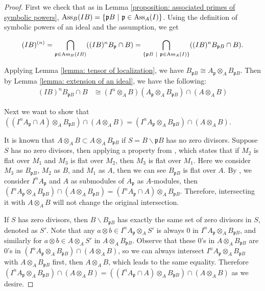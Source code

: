 \documentclass[12pt]{amsart}
\numberwithin{equation}{section}
\theoremstyle{definition}
\DeclareMathOperator{\Ass}{Ass}
\def\pp{{\frak p}}
\begin{document}
	\begin{proof} 
	First we check that as in Lemma \ref{proposition: associated primes of symbolic powers},  $\Ass_B (IB) = \{ {\pp}B ~|~ {\pp} \in \Ass_A (I) \} $. 	
Using the definition of symbolic powers of an ideal and the assumption, we get
		
$$(IB)^{(n)} = \bigcap_{{\pp} \in \Ass_B(IB)} ((IB)^n B_{{\pp}} \cap B)=\bigcap_{\{ {\pp}B ~|~ {\pp} \in \Ass_A(I) \}} ((IB)^n B_{ {\pp}B } \cap B).$$

Applying Lemma \ref{lemma: tensor of localization}, we have $B_{\mathfrak{p}B} \cong A_{\mathfrak{p}} \otimes_A B_{\mathfrak{p}B}$. Then by Lemma \ref{lemma: extension of an ideal}, we have the following:
			\begin{align*}
			(IB)^n B_{\mathfrak{p}B} \cap B &\cong (I^n \otimes_A B) (A_{\mathfrak{p}} \otimes_A B_{\mathfrak{p}B}) \cap (A \otimes_A B)
		\end{align*}
\par Next we want to show that $(( I^n A_{\mathfrak{p}} \cap A ) \otimes_A B_{\mathfrak{p}B}) \cap (A \otimes_A B) = ( I^n A_{\mathfrak{p}} \otimes_A B_{\mathfrak{p}B} ) \cap (A \otimes_A B)$. 

It is known that $A \otimes_A B \subset A \otimes_A B_{\mathfrak{p}B} $ if $S = B \backslash \mathfrak{p}B$ has no zero divisors. Suppose $S$ has no zero divisors, then applying a property from \cite[section 7]{matsumura1989commutative}, which states that if $M_2$ is flat over $M_1$ and $M_3$ is flat over $M_2$, then $M_3$ is flat over $M_1$. Here we consider $M_3$ as $B_{\mathfrak{p}B}$, $M_2$ as $B$, and $M_1$ as $A$, then we can see $B_{\mathfrak{p}B}$ is flat over $A$. By \cite[Theorem 7.4(I)]{matsumura1989commutative}, we consider $I^n A_{\mathfrak{p}}$ and $A$ as submodules of $A_{\mathfrak{p}}$ as $A$-modules, then $\left(I^n A_{\mathfrak{p}} \otimes_A B_{\mathfrak{p}B}\right) \cap \left( A \otimes_A B_{\mathfrak{p}B}\right) = ( I^n A_{\mathfrak{p}} \cap A ) \otimes_A B_{\mathfrak{p}B}$.  Therefore, intersecting it with $A\otimes_A B$ will not change the original intersection. 

If $S$ has zero divisors, then $B \backslash B_{\mathfrak{p}B}$ has exactly the same set of zero divisors in $S$, denoted as $S'$. Note that any $a \otimes b \in I^n A_{\mathfrak{p}} \otimes_A S'$ is always $0$ in $I^n A_{\mathfrak{p}} \otimes_A B_{\mathfrak{p}B}$, and similarly for $a \otimes b \in A \otimes_A S'$ in $A \otimes_A B_{\mathfrak{p}B}$. Observe that these 0's in $A \otimes_A B_{\mathfrak{p}B}$ are 0's in $( I^n A_{\mathfrak{p}} \otimes_A B_{\mathfrak{p}B} ) \cap (A \otimes_A B)$, so we can always intersect $I^n A_{\mathfrak{p}} \otimes_A B_{\mathfrak{p}B}$ with $A \otimes_A B_{\mathfrak{p}B}$ first, then $A \otimes_A B$, which leads to the same equality. Therefore $( I^n A_{\mathfrak{p}} \otimes_A B_{\mathfrak{p}B} ) \cap (A \otimes_A B) = (( I^n A_{\mathfrak{p}} \cap A ) \otimes_A B_{\mathfrak{p}B}) \cap (A \otimes_A B)$ as we desire. 


\end{proof}
\end{document}
